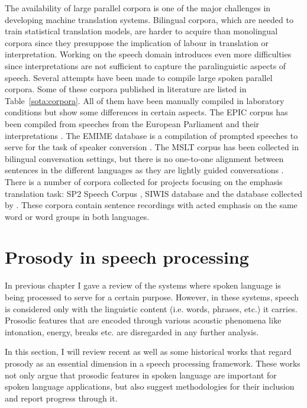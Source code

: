 The availability of large parallel corpora is one of the major challenges in developing machine translation systems. Bilingual corpora, which are needed to train statistical translation models, are harder to acquire than monolingual corpora since they presuppose the implication of labour in translation or interpretation. Working on the speech domain introduces even more difficulties since interpretations are not sufficient to capture the paralinguistic aspects of speech. Several attempts have been made to compile large spoken parallel corpora. Some of these corpora published in literature are listed in Table~\ref{sota:corpora}. All of them have been manually compiled in laboratory conditions but show some differences in certain aspects. The EPIC corpus has been compiled from speeches from the European Parliament and their interpretations \citep{bendazzoli2005approach}. The EMIME database is a compilation of prompted speeches to serve for the task of speaker conversion \citep{wester2010emime}. The MSLT corpus has been collected in bilingual conversation settings, but there is no one-to-one alignment between sentences in the different languages as they are lightly guided conversations \citep{federmann2016microsoft}. There is a number of corpora collected for projects focusing on the emphasis translation task: SP2 Speech Corpus \citep{sevcujski2016design}, SIWIS database \citep{siwis_db} and the database collected by \cite{quoc_corpus}. These corpora contain sentence recordings with acted emphasis on the same word or word groups in both languages. 

\section{Prosody in speech processing}
In previous chapter I gave a review of the systems where spoken language is being processed to serve for a certain purpose. However, in these systems, speech is considered only with the linguistic content (i.e. words, phrases, etc.) it carries. Prosodic features that are encoded through various acoustic phenomena like intonation, energy, breaks etc. are disregarded in any further analysis.  

In this section, I will review recent as well as some historical works that regard prosody as an essential dimension in a speech processing framework. These works not only argue that prosodic features in spoken language are important for spoken language applications, but also suggest methodologies for their inclusion and report progress through it. 

